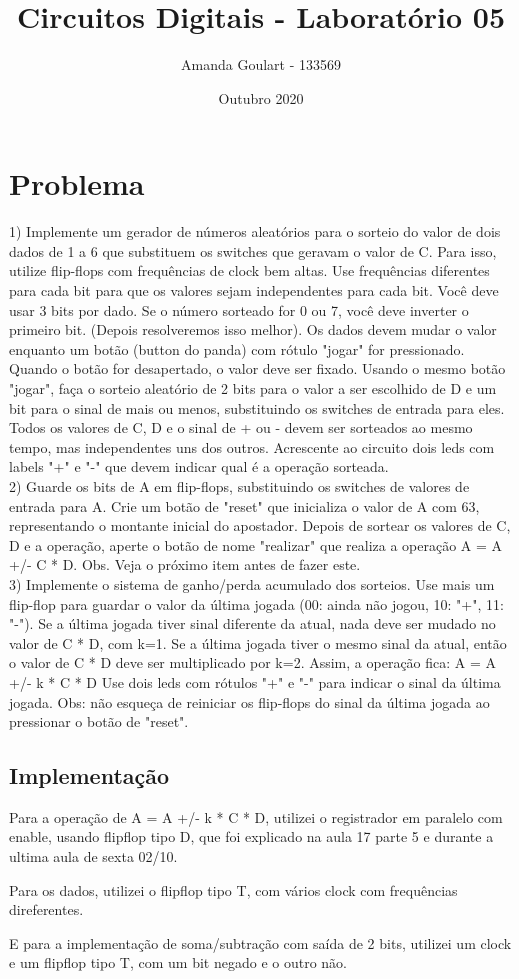 \documentclass{article}
\title{Circuitos Digitais - Laboratório 05}
\author{Amanda Goulart - 133569}
\date{Outubro 2020}
\begin{document}
\maketitle

\section{Problema}
1) Implemente um gerador de números aleatórios para o sorteio do valor de dois dados de 1 a 6 que
substituem os switches que geravam o valor de C. Para isso, utilize flip-flops com frequências de clock
bem altas. Use frequências diferentes para cada bit para que os valores sejam independentes para cada
bit. Você deve usar 3 bits por dado. Se o número sorteado for 0 ou 7, você deve inverter o primeiro bit.
(Depois resolveremos isso melhor). Os dados devem mudar o valor enquanto um botão (button do
panda) com rótulo "jogar" for pressionado. Quando o botão for desapertado, o valor deve ser fixado.
Usando o mesmo botão "jogar", faça o sorteio aleatório de 2 bits para o valor a ser escolhido de D e um
bit para o sinal de mais ou menos, substituindo os switches de entrada para eles.
Todos os valores de C, D e o sinal de + ou - devem ser sorteados ao mesmo tempo, mas independentes
uns dos outros.
Acrescente ao circuito dois leds com labels "+" e "-" que devem indicar qual é a operação sorteada.
\\
2) Guarde os bits de A em flip-flops, substituindo os switches de valores de entrada para A. Crie um
botão de "reset" que inicializa o valor de A com 63, representando o montante inicial do apostador.
Depois de sortear os valores de C, D e a operação, aperte o botão de nome "realizar" que realiza a
operação A = A +/- C * D. Obs. Veja o próximo item antes de fazer este.
\\
3) Implemente o sistema de ganho/perda acumulado dos sorteios. Use mais um flip-flop para guardar o
valor da última jogada (00: ainda não jogou, 10: "+", 11: "-").
Se a última jogada tiver sinal diferente da atual, nada deve ser mudado no valor de C * D, com k=1.
Se a última jogada tiver o mesmo sinal da atual, então o valor de C * D deve ser multiplicado por k=2.
Assim, a operação fica: A = A +/- k * C * D
Use dois leds com rótulos "+" e "-" para indicar o sinal da última jogada.
Obs: não esqueça de reiniciar os flip-flops do sinal da última jogada ao pressionar o botão de "reset".
\subsection{Implementação}

Para a operação de A = A +/- k * C * D, utilizei o registrador em paralelo com enable, usando flipflop tipo D, que foi explicado na aula 17 parte 5 e durante a ultima aula de sexta 02/10.

Para os dados, utilizei o flipflop tipo T, com vários clock com frequências direferentes. 

E para a implementação de soma/subtração com saída de 2 bits, utilizei um clock e um flipflop tipo T, com um bit negado e o outro não. 
\end{document}

